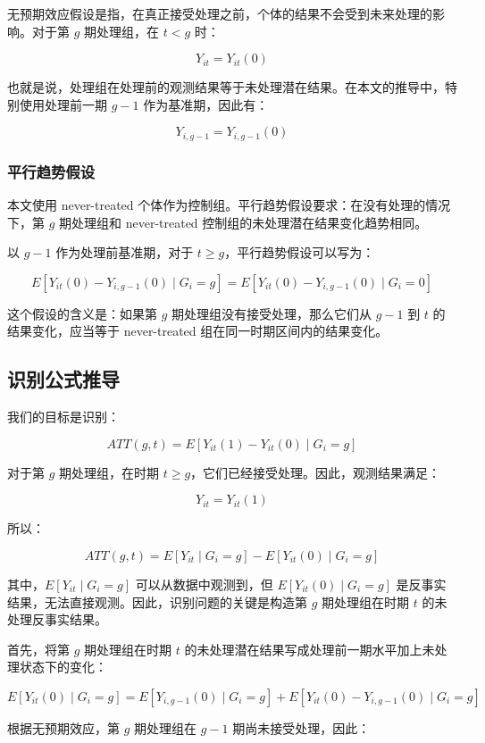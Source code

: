 \documentclass[
  fontset=windows]{ctexart}
\begin{document}
无预期效应假设是指，在真正接受处理之前，个体的结果不会受到未来处理的影响。对于第
\(g\) 期处理组，在 \(t<g\) 时：

\[
Y_{it}=Y_{it}(0)
\]

也就是说，处理组在处理前的观测结果等于未处理潜在结果。在本文的推导中，特别使用处理前一期
\(g-1\) 作为基准期，因此有：

\[
Y_{i,g-1}=Y_{i,g-1}(0)
\]

\subsubsection{平行趋势假设}\label{ux5e73ux884cux8d8bux52bfux5047ux8bbe}

本文使用 never-treated
个体作为控制组。平行趋势假设要求：在没有处理的情况下，第 \(g\)
期处理组和 never-treated 控制组的未处理潜在结果变化趋势相同。

以 \(g-1\) 作为处理前基准期，对于 \(t\geq g\)，平行趋势假设可以写为：

\[
E[Y_{it}(0)-Y_{i,g-1}(0)\mid G_i=g]
=
E[Y_{it}(0)-Y_{i,g-1}(0)\mid G_i=0]
\]

这个假设的含义是：如果第 \(g\) 期处理组没有接受处理，那么它们从 \(g-1\)
到 \(t\) 的结果变化，应当等于 never-treated
组在同一时期区间内的结果变化。

\subsection{识别公式推导}\label{ux8bc6ux522bux516cux5f0fux63a8ux5bfc}

我们的目标是识别：

\[
ATT(g,t)=E[Y_{it}(1)-Y_{it}(0)\mid G_i=g]
\]

对于第 \(g\) 期处理组，在时期
\(t\geq g\)，它们已经接受处理。因此，观测结果满足：

\[
Y_{it}=Y_{it}(1)
\]

所以：

\[
ATT(g,t)
=
E[Y_{it}\mid G_i=g]
-
E[Y_{it}(0)\mid G_i=g]
\]

其中，\(E[Y_{it}\mid G_i=g]\) 可以从数据中观测到，但
\(E[Y_{it}(0)\mid G_i=g]\)
是反事实结果，无法直接观测。因此，识别问题的关键是构造第 \(g\)
期处理组在时期 \(t\) 的未处理反事实结果。

首先，将第 \(g\) 期处理组在时期 \(t\)
的未处理潜在结果写成处理前一期水平加上未处理状态下的变化：

\[
E[Y_{it}(0)\mid G_i=g]
=
E[Y_{i,g-1}(0)\mid G_i=g]
+
E[Y_{it}(0)-Y_{i,g-1}(0)\mid G_i=g]
\]

根据无预期效应，第 \(g\) 期处理组在 \(g-1\) 期尚未接受处理，因此：
\end{document}
